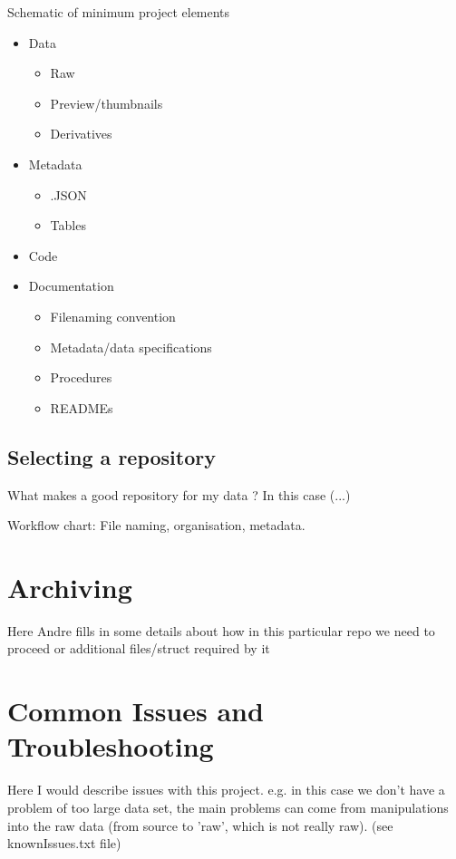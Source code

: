 \documentclass[a4paper,11pt]{report}
\begin{document}
Schematic of minimum project elements
\begin{itemize}
    \item  Data
    \begin {itemize} 
        \item Raw
        \item Preview/thumbnails
        \item Derivatives
    \end{itemize}
    \item  Metadata    
    \begin {itemize} 
        \item .JSON 
        \item Tables         
    \end{itemize}
    \item  Code    
    \item  Documentation
    \begin {itemize} 
        \item Filenaming convention
        \item Metadata/data specifications
        \item Procedures       
        \item READMEs 
    \end{itemize}
\end{itemize} 

\subsection*{Selecting a repository}
What makes a good repository for my data ? In this case (...)

Workflow chart: File naming, organisation, metadata.

\section*{Archiving} 
Here Andre fills in  some details about how in this particular repo we need to proceed or additional files/struct required by it


\section*{Common Issues and Troubleshooting} 
Here I would describe issues with this project. e.g. in this case we don't have a problem of too large data set, the main problems can come from manipulations into the raw data (from source to 'raw', which is not really raw). (see knownIssues.txt file)
\end{document}
